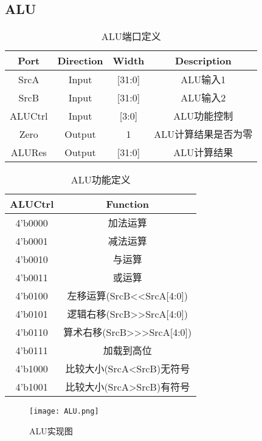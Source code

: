 \documentclass[UTF8]{ctexart}
\begin{document}
\subsection{ALU}
\begin{table}[H]
	\centering
	\begin{threeparttable}
		\caption{ALU端口定义}
		\begin{tabular}{cccc}
			\toprule
			\rowcolor{mypink}
			\textbf{Port} & \textbf{Direction} & \textbf{Width} & \textbf{Description} \\
			\midrule
			SrcA          & Input              & [31:0]         & ALU输入1             \\
			\midrule
			SrcB          & Input              & [31:0]         & ALU输入2             \\
			\midrule
			ALUCtrl       & Input              & [3:0]          & ALU功能控制          \\
			\midrule
			Zero          & Output             & 1              & ALU计算结果是否为零  \\
			\midrule
			ALURes        & Output             & [31:0]         & ALU计算结果          \\
			\midrule
		\end{tabular}
	\end{threeparttable}
\end{table}
\begin{table}[H]
	\centering
	\begin{threeparttable}
		\caption{ALU功能定义}
		\begin{tabular}{cc}
			\toprule
			\rowcolor{mypink}
			\textbf{ALUCtrl} & \textbf{Function}          \\
			\midrule
			4'b0000          & 加法运算                   \\
			\midrule
			4'b0001          & 减法运算                   \\
			\midrule
			4'b0010          & 与运算                     \\
			\midrule
			4'b0011          & 或运算                     \\
			\midrule
			4'b0100          & 左移运算(SrcB<<SrcA[4:0])  \\
			\midrule
			4'b0101          & 逻辑右移(SrcB>>SrcA[4:0])  \\
			\midrule
			4'b0110          & 算术右移(SrcB>>>SrcA[4:0]) \\
			\midrule
			4'b0111          & 加载到高位                 \\
			\midrule
			4'b1000          & 比较大小(SrcA<SrcB)无符号  \\
			\midrule
			4'b1001          & 比较大小(SrcA>SrcB)有符号  \\
			\midrule
		\end{tabular}
	\end{threeparttable}
\end{table}
\begin{figure}[H]
	\centering
	\texttt{[image: ALU.png]}
	\caption{ALU实现图}
\end{figure}
\newpage
\end{document}
